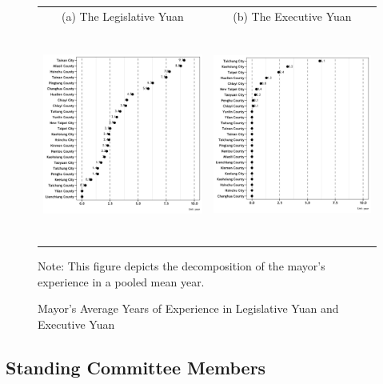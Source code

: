 \begin{figure}[ht]
\begin{singlespace}
\begin{centering}
\caption{Mayor's Average Years of Experience in Legislative Yuan and Executive Yuan\label{fig: figure5}}
\par\end{centering}
\end{singlespace}
\begin{tabular}{cc}
(a) The Legislative Yuan & (b) The Executive Yuan\tabularnewline
\includegraphics[width=7cm,height=7cm]{04-Chapter-Four/image/figure5-1.jpeg} & \includegraphics[width=7cm,height=7cm]{04-Chapter-Four/image/figure5-2.jpeg}\tabularnewline
\end{tabular}
Note: This figure depicts the decomposition of the mayor's experience in a pooled mean year.
\end{figure}


\subsection*{Standing Committee Members}



